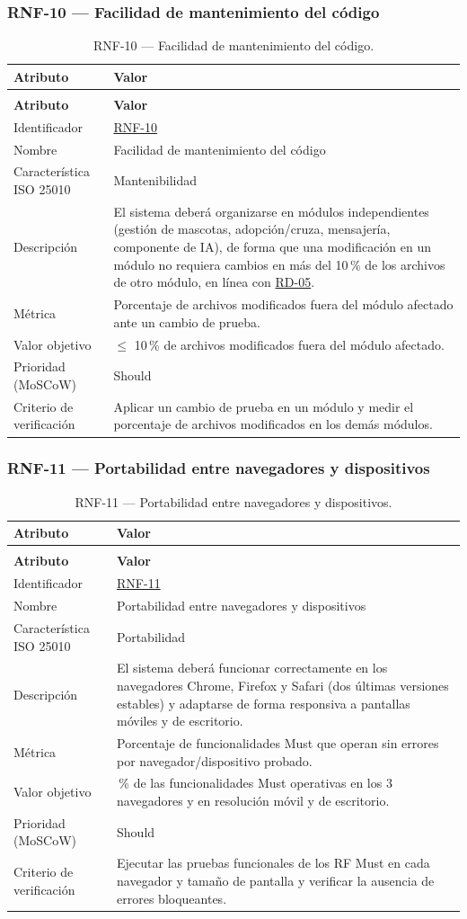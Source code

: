 \documentclass[journal,onecolumn]{IEEEtran}
\makeatletter
\newenvironment{atributos}[2]{%
	\small
	\begin{longtable}{@{}>{\raggedright\arraybackslash}p{4.2cm} >{\raggedright\arraybackslash}p{11.2cm}@{}}
		\caption{#2}\label{tab:#1}\\
		\toprule
		\textbf{Atributo} & \textbf{Valor} \\
		\midrule
		\endfirsthead
		\multicolumn{2}{@{}l}{\small\itshape (continuación)}\\
		\toprule
		\textbf{Atributo} & \textbf{Valor} \\
		\midrule
		\endhead
		\bottomrule
		\endlastfoot
	}{%
	\end{longtable}
	\normalsize
}
\makeatother
\begin{document}
	\subsubsection{RNF-10 --- Facilidad de mantenimiento del código}
	
	\begin{atributos}{RNF-10}{RNF-10 --- Facilidad de mantenimiento del código.}
		Identificador & \hyperref[tab:RNF-10]{RNF-10} \\
		Nombre & Facilidad de mantenimiento del código \\
		Característica ISO 25010 & Mantenibilidad \\
		Descripción & El sistema deberá organizarse en módulos independientes (gestión de mascotas, adopción/cruza, mensajería, componente de IA), de forma que una modificación en un módulo no requiera cambios en más del 10\,\% de los archivos de otro módulo, en línea con \hyperref[tab:RD-05]{RD-05}. \\
		Métrica & Porcentaje de archivos modificados fuera del módulo afectado ante un cambio de prueba. \\
		Valor objetivo & $\leq$ 10\,\% de archivos modificados fuera del módulo afectado. \\
		Prioridad (MoSCoW) & Should \\
		Criterio de verificación & Aplicar un cambio de prueba en un módulo y medir el porcentaje de archivos modificados en los demás módulos. \\
	\end{atributos}
	
	\subsubsection{RNF-11 --- Portabilidad entre navegadores y dispositivos}
	
	\begin{atributos}{RNF-11}{RNF-11 --- Portabilidad entre navegadores y dispositivos.}
		Identificador & \hyperref[tab:RNF-11]{RNF-11} \\
		Nombre & Portabilidad entre navegadores y dispositivos \\
		Característica ISO 25010 & Portabilidad \\
		Descripción & El sistema deberá funcionar correctamente en los navegadores Chrome, Firefox y Safari (dos últimas versiones estables) y adaptarse de forma responsiva a pantallas móviles y de escritorio. \\
		Métrica & Porcentaje de funcionalidades Must que operan sin errores por navegador/dispositivo probado. \\
		Valor objetivo & 100\,\% de las funcionalidades Must operativas en los 3 navegadores y en resolución móvil y de escritorio. \\
		Prioridad (MoSCoW) & Should \\
		Criterio de verificación & Ejecutar las pruebas funcionales de los RF Must en cada navegador y tamaño de pantalla y verificar la ausencia de errores bloqueantes. \\
	\end{atributos}
	
\end{document}
